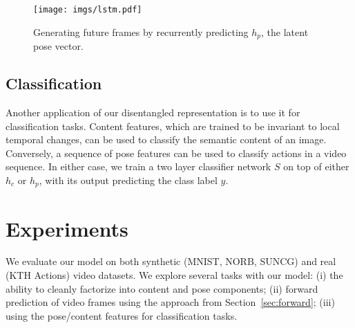 \documentclass{article}
\newcommand{\secc}[1]{Section~\ref{sec:#1}}
\newcommand{\rob}[1]{\textbf{\textcolor{red}{#1}}}
\begin{document}
\begin{figure}
    \centering
    \texttt{[image: imgs/lstm.pdf]}
    \caption{Generating future frames by recurrently predicting $h_p$, the latent pose vector. }
    \label{fig:prediction}
\vspace{-3mm}
\end{figure}\subsection{Classification}
Another application of our disentangled representation is to use it for classification tasks. Content features, which are trained to be invariant to local temporal changes, can be used to classify the semantic content of an image. Conversely, a sequence of pose features can be used to classify actions in a video sequence. In either case, we train a two layer classifier network $S$ on top of either $h_c$ or $h_p$, with its output predicting the class label $y$. 

%
\section{Experiments}
We evaluate our model on both synthetic (MNIST, NORB, SUNCG) and real
(KTH Actions) video datasets. We explore several tasks with our model:
(i) the ability to cleanly factorize into content and pose components;
(ii) forward prediction of video frames using the approach from
\secc{forward}; (iii) using the pose/content features for
classification tasks.
\end{document}
